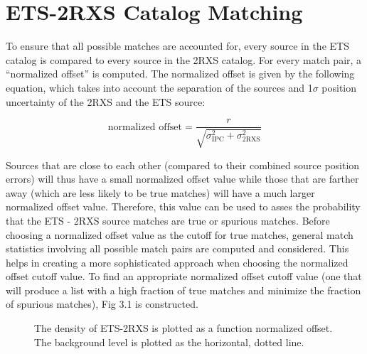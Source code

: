\FloatBarrier

\section{ETS-2RXS Catalog Matching}

To ensure that all possible matches are accounted for, every source in the ETS catalog is compared to every source in the 2RXS catalog. 
For every match pair, a “normalized offset” is computed. 
The normalized offset is given by the following equation, which takes into account the separation of the sources and 1$\sigma$ position uncertainty  of the 2RXS and the ETS source:

\begin{equation}
    \text{normalized offset} = \frac{r}{\sqrt{\sigma_{ \text{IPC} }^2  + \sigma_{ \text{2RXS}}^2 }    }
\end{equation}

Sources that are close to each other (compared to their combined source position errors) will thus have a small normalized offset value while those that are farther away  (which are less likely to be true matches) will have a much larger normalized offset value. 
Therefore, this value can be used to asses the probability that the ETS - 2RXS source matches are true or spurious matches. 
Before choosing a normalized offset value as the cutoff for true matches, general match statistics involving all possible match pairs are computed and considered. 
This helps in creating a more sophisticated approach when choosing the normalized offset cutoff value.
To find an appropriate  normalized offset cutoff value (one that will produce a list with a high fraction of true matches and minimize the fraction of spurious matches), Fig 3.1 is constructed. 

\begin{figure}[h]
\centering
{}
\caption{The density of ETS-2RXS is plotted as a function normalized offset. The background level is plotted as the horizontal, dotted line. }
\label{imbeded_fb}
\end{figure}

